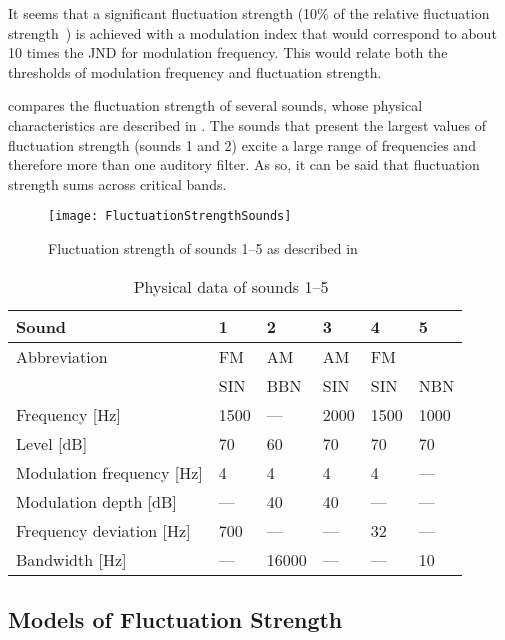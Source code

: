 \documentclass[../main.tex]{subfiles}
\begin{document}
\begin{theoreticalbackground}
It seems that a significant fluctuation strength (10\% of the relative
fluctuation strength~\cite[pp.~251]{Fastl2007Psychoacoustics}) is achieved with
a modulation index that would correspond to about 10 times the \gls{JND} for
modulation frequency. This would relate both the thresholds of modulation
frequency and fluctuation strength.

 compares the fluctuation strength of several sounds,
whose physical characteristics are described in . The
sounds that present the largest values of fluctuation strength (sounds 1 and 2)
excite a large range of frequencies and therefore more than one auditory filter.
As so, it can be said that fluctuation strength sums across critical bands.

\begin{figure}[!ht]
  \centering
  \texttt{[image: FluctuationStrengthSounds]}
  \caption{Fluctuation strength of sounds 1--5 as described in
    ~\cite[pp. 252]{Fastl2007Psychoacoustics}}
\label{fig:flucstrensnds}
\end{figure}

\begin{table}[!ht]
  \centering
  \begin{tabu} to \linewidth{ lXXXXX }
    \toprule
    Sound & 1 & 2 & 3 & 4 & 5 \\
    \midrule
    Abbreviation & FM & AM & AM & FM & \\
    & SIN & BBN & SIN & SIN & NBN \\
    Frequency [Hz] & 1500 & --- & 2000 & 1500 & 1000 \\
    Level [dB] & 70 & 60 & 70 & 70 & 70 \\
    Modulation frequency [Hz] & 4 & 4 & 4 & 4 & --- \\
    Modulation depth [dB] & --- & 40 & 40 & --- & --- \\
    Frequency deviation [Hz] & 700 & --- & --- & 32 & --- \\
    Bandwidth [Hz] & --- & 16000 & --- & --- & 10 \\
    \bottomrule
  \end{tabu}
  \caption{Physical data of sounds
    1--5~\cite[pp. 253]{Fastl2007Psychoacoustics}}
\label{tab:flucstrensnds}
\end{table}

\subsection{Models of Fluctuation Strength}


\end{theoreticalbackground}
\end{document}
